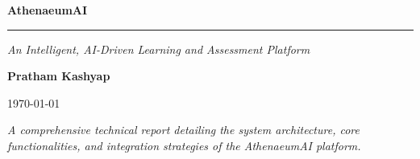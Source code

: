 \documentclass[12pt,a4paper]{article}
\begin{document}
\begin{titlepage}
    \centering
    \vspace*{3cm}
    
    {\Huge \bfseries \textcolor{primary}{AthenaeumAI}\par}
    \vspace{0.5cm}
    \rule{0.6\textwidth}{1pt}\par
    \vspace{1cm}
    {\Large \itshape An Intelligent, AI-Driven Learning and Assessment Platform\par}
    
    \vspace{4cm}
    
    {\Large \bfseries Pratham Kashyap\par}
    \vspace{0.5cm}
    {\large \today\par}
    
    \vfill
    
    {\normalsize \textit{A comprehensive technical report detailing the system architecture, core functionalities, and integration strategies of the AthenaeumAI platform.}\par}
\end{titlepage}

\newpage

\begin{abstract}
    \noindent \normalsize Modern educational paradigms necessitate highly adaptable and personalized studying methodologies. AthenaeumAI was developed to address this requirement by providing an intelligent software ecosystem capable of dynamically synthesizing exam-style assessments from user-provided documentation. By harnessing the computational reasoning capabilities of Large Language Models (LLMs)—specifically Llama 3 70B—via an optimized backend architecture, the platform significantly reduces manual preparation time. This report elaborates on the system's core capabilities, its underlying modular architecture, and the systematic processes involved in its deployment and utilization.
\end{abstract}

\vspace{1cm}
\tableofcontents
\newpage
\end{document}
